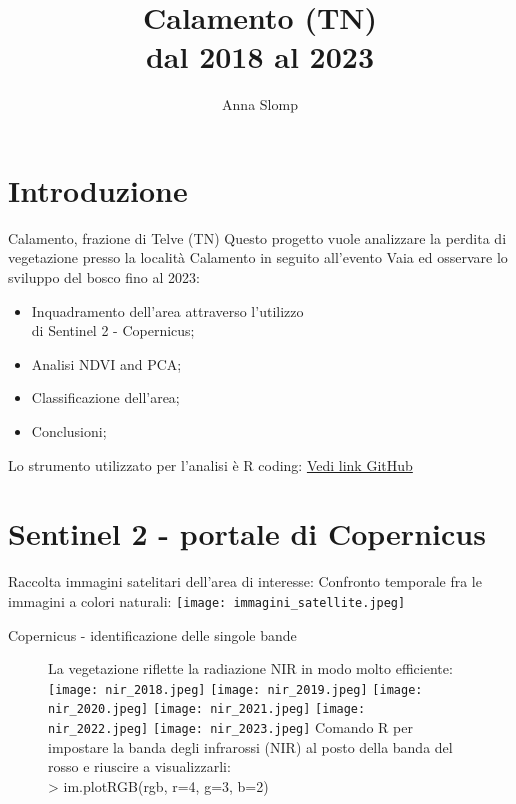 \documentclass[10pt]{beamer}
\title{Calamento (TN)\\
dal 2018 al 2023}
\author{Anna Slomp}
\begin{document}
\maketitle


\section{Introduzione}
\begin{frame}{Calamento, frazione di Telve (TN)}
Questo progetto vuole analizzare la perdita di vegetazione presso la località Calamento in seguito all'evento Vaia ed osservare lo sviluppo del bosco fino al 2023:
\begin{itemize}
    \item Inquadramento dell'area attraverso l'utilizzo\\
    di Sentinel 2 - Copernicus;
    \item Analisi NDVI and PCA; 
    \item Classificazione dell'area;
    \item Conclusioni;
\end{itemize}
Lo strumento utilizzato per l'analisi è R coding:
\href{https://github.com/DM001-1/telerilevamento_23_24/blob/main/R_script_exam.R}{Vedi link GitHub}
\end{frame}    

\section{Sentinel 2 - portale di Copernicus}
\begin{frame}{Raccolta immagini satelitari dell'area di interesse:}
Confronto temporale fra le immagini a colori naturali: 
\texttt{[image: immagini\_satellite.jpeg]}
\end{frame}

\begin{frame}{Copernicus - identificazione delle singole bande}
\begin{figure}
La vegetazione riflette la radiazione NIR in modo molto efficiente:
        \centering
        \texttt{[image: nir\_2018.jpeg]}
        \texttt{[image: nir\_2019.jpeg]} 
        \texttt{[image: nir\_2020.jpeg]}
        \texttt{[image: nir\_2021.jpeg]}
        \texttt{[image: nir\_2022.jpeg]} 
        \texttt{[image: nir\_2023.jpeg]}
Comando R per impostare la banda degli infrarossi (NIR) al posto della banda del rosso e riuscire a visualizzarli:\\ 
> im.plotRGB(rgb, r=4, g=3, b=2)
    \end{figure}
\end{frame}
\end{document}
